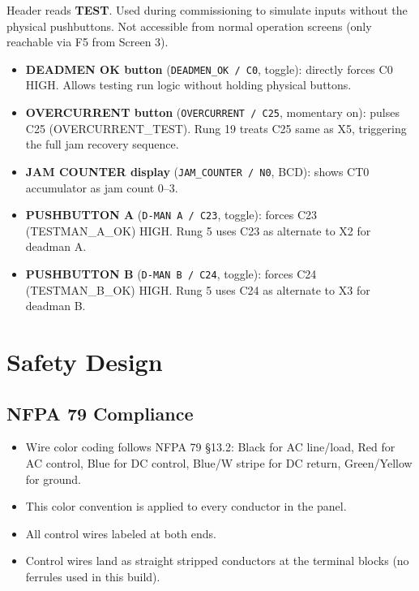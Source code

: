 \documentclass[hidelinks,12pt]{article}
\begin{document}
Header reads \textbf{TEST}. Used during commissioning to simulate inputs
without the physical pushbuttons. Not accessible from normal operation screens
(only reachable via F5 from Screen 3).

\begin{itemize}
    \item \textbf{DEADMEN OK button} (\texttt{DEADMEN\_OK / C0}, toggle): directly forces C0 HIGH. Allows testing run logic without holding physical buttons.
    \item \textbf{OVERCURRENT button} (\texttt{OVERCURRENT / C25}, momentary on): pulses C25 (OVERCURRENT\_TEST). Rung 19 treats C25 same as X5, triggering the full jam recovery sequence.
    \item \textbf{JAM COUNTER display} (\texttt{JAM\_COUNTER / N0}, BCD): shows CT0 accumulator as jam count 0--3.
    \item \textbf{PUSHBUTTON A} (\texttt{D-MAN A / C23}, toggle): forces C23 (TESTMAN\_A\_OK) HIGH. Rung 5 uses C23 as alternate to X2 for deadman A.
    \item \textbf{PUSHBUTTON B} (\texttt{D-MAN B / C24}, toggle): forces C24 (TESTMAN\_B\_OK) HIGH. Rung 5 uses C24 as alternate to X3 for deadman B.
\end{itemize}


\section{Safety Design}

\subsection{NFPA 79 Compliance}
\begin{itemize}
    \item Wire color coding follows NFPA 79 §13.2: Black for AC line/load, Red for AC control, Blue for DC control, Blue/W stripe for DC return, Green/Yellow for ground.
    \item This color convention is applied to every conductor in the panel.
    \item All control wires labeled at both ends.
    \item Control wires land as straight stripped conductors at the terminal blocks (no ferrules used in this build).
\end{itemize}
\end{document}
